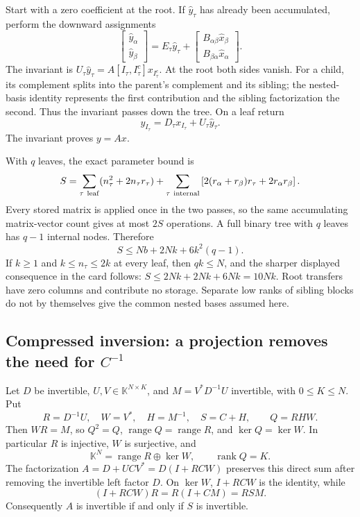 \documentclass[11pt,a4paper]{article}
\DeclareMathOperator{\rank}{rank}
\begin{document}
Start with a zero coefficient at the root. If $\widehat y_\tau$ has
already been accumulated, perform the downward assignments
\[
 \begin{bmatrix}\widehat y_\alpha\\\widehat y_\beta\end{bmatrix}
 =E_\tau\widehat y_\tau+
 \begin{bmatrix}
 B_{\alpha\beta}\widehat x_\beta\\
 B_{\beta\alpha}\widehat x_\alpha
 \end{bmatrix}.
\]
The invariant is
$U_\tau\widehat y_\tau=A[I_\tau,I_\tau^c]x_{I_\tau^c}$.
At the root both sides vanish. For a child, its complement splits into
the parent's complement and its sibling; the nested-basis identity
represents the first contribution and the sibling factorization the
second. Thus the invariant passes down the tree. On a leaf return
\[
 y_{I_\tau}=D_\tau x_{I_\tau}+U_\tau\widehat y_\tau.
\]
The invariant proves $y=Ax$.

With $q$ leaves, the exact parameter bound is
\[
 S=\sum_{\tau\ {\rm leaf}}(n_\tau^2+2n_\tau r_\tau)
 +\sum_{\tau\ {\rm internal}}
 \left[2(r_\alpha+r_\beta)r_\tau+2r_\alpha r_\beta\right].
\]
Every stored matrix is applied once in the two passes, so the same
accumulating matrix-vector count gives at most $2S$ operations. A full
binary tree with $q$ leaves has $q-1$ internal nodes. Therefore
\[
 S\le Nb+2Nk+6k^2(q-1).
\]
If $k\ge1$ and $k\le n_\tau\le2k$ at every leaf, then $qk\le N$,
and the sharper displayed consequence in the card follows:
$S\le2Nk+2Nk+6Nk=10Nk$. Root transfers have zero columns and contribute
no storage. Separate low ranks of sibling blocks do not by themselves
give the common nested bases assumed here.

\subsection{Compressed inversion: a projection removes the need for $C^{-1}$}

Let $D$ be invertible, $U,V\in\mathbb K^{N\times K}$, and
$M=V^*D^{-1}U$ invertible, with $0\le K\le N$. Put
\[
 R=D^{-1}U,\quad W=V^*,\quad H=M^{-1},\quad S=C+H,
 \qquad Q=RHW.
\]
Then $WR=M$, so $Q^2=Q$, $\operatorname{range}Q=\operatorname{range}R$,
and $\ker Q=\ker W$. In particular $R$ is injective, $W$ is surjective,
and
\[
 \mathbb K^N=\operatorname{range}R\oplus\ker W,\qquad\rank Q=K.
\]
The factorization $A=D+UCV^*=D(I+RCW)$ preserves this direct sum after
removing the invertible left factor $D$. On $\ker W$, $I+RCW$ is the
identity, while
\[
 (I+RCW)R=R(I+CM)=RSM.
\]
Consequently $A$ is invertible if and only if $S$ is invertible.
\end{document}
